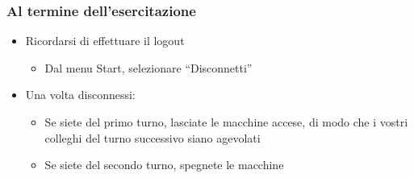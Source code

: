 \documentclass{beamer}
\begin{document}
\begin{frame}
\frametitle{Al termine dell'esercitazione}
\begin{itemize}
 \item Ricordarsi di effettuare il logout
  \begin{itemize}
    \item Dal menu Start, selezionare ``Disconnetti''
  \end{itemize}
 \item Una volta disconnessi:
  \begin{itemize}
    \item Se siete del primo turno, lasciate le macchine accese, di modo che i vostri colleghi del turno successivo siano agevolati
    \item Se siete del secondo turno, spegnete le macchine
  \end{itemize}
\end{itemize}
\end{frame}
\end{document}

